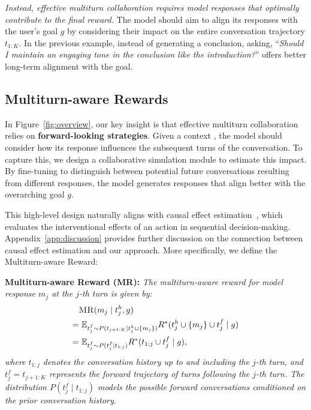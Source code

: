\textit{Instead, effective multiturn collaboration requires model responses that optimally contribute to the final reward.} The model should aim to align its responses with the user’s goal $g$ by considering their impact on the entire conversation trajectory $t_{1:K}$. 
In the previous example, instead of generating a conclusion, asking, ``\textit{Should I maintain an engaging tone in the conclusion like the introduction?}'' offers better long-term alignment with the goal. 


\subsection{Multiturn-aware Rewards}
\label{sec:reward} 

In Figure~\ref{fig:overview}, our key insight is that effective multiturn collaboration relies on \textbf{forward-looking strategies}. Given a context , the model should consider how its response  influences the subsequent turns of the conversation. To capture this, we design a  collaborative simulation module to estimate this impact. By  fine-tuning to distinguish between potential future conversations resulting from different responses, the model generates responses that align better with the overarching goal $g$. 

This high-level design naturally aligns with causal effect estimation~\citep{Pearl09a, pearl2016causal}, which evaluates the interventional effects of an action in sequential decision-making.
Appendix~\ref{app:discussion} provides further discussion on the connection between causal effect estimation and our approach.
More specifically, we define the Multiturn-aware Reward:



\textbf{Multiturn-aware Reward (MR):}  
\textit{The multiturn-aware reward for model response $m_j$ at the $j$-th turn is given by:}
\begin{equation}
\begin{aligned}
    &\text{\textsc{MR}}(m_j \mid t_j^h, g) \\=& 
    ~\mathbb{E}_{t_j^f \sim P(t_{j+1:K} \mid t_j^h \cup \{m_j\})} R^*(t_j^h \cup \{m_j\} \cup t_j^f \mid g) \\
    = &~\mathbb{E}_{t_j^f \sim P(t_j^f \mid t_{1:j})} R^*(t_{1:j} \cup t_j^f \mid g),
    \label{eq:main}
\end{aligned}
\end{equation}
\textit{where $t_{1:j}$ denotes the conversation history up to and including the $j$-th turn, and {\small $t_j^f = t_{j+1:K}$} represents the forward trajectory of turns following the $j$-th turn. The distribution {\small $P(t_j^f \mid t_{1:j})$} models the possible forward conversations conditioned on the prior conversation history.} 


